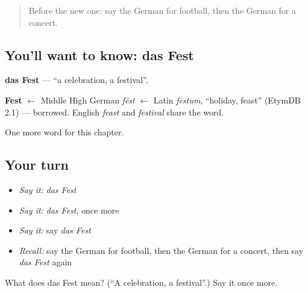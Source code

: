 \begin{quote}
Before the new one: say the German for football, then the German for a concert.
\end{quote}

\subsection*{You'll want to know: das Fest}
\textbf{das Fest} — \textquotedblleft{}a celebration, a festival\textquotedblright{}.

\begin{cousinweb}
\textbf{Fest} $\leftarrow$ Middle High German \emph{fëst} $\leftarrow$ Latin \emph{fēstum}, \textquotedblleft{}holiday, feast\textquotedblright{} (EtymDB 2.1) — borrowed. English \emph{feast} and \emph{festival} share the word.
\end{cousinweb}

\begin{grammarlens}[title={What you've built}]
One more word for this chapter.
\end{grammarlens}

\subsection*{Your turn}
\begin{itemize}
\raggedright
  \item \emph{Say it:} \emph{das Fest}
  \item \emph{Say it:} \emph{das Fest}, once more
  \item \emph{Say it:} say \emph{das Fest}
  \item \emph{Recall:} say the German for football, then the German for a concert, then say \emph{das Fest} again
\end{itemize}

\begin{tcolorbox}[breakable,colback=teal!4,colframe=teal!35!black,title={Before you move on}]
What does das Fest mean? (\textquotedblleft{}A celebration, a festival\textquotedblright{}.) Say it once more.
\end{tcolorbox}
